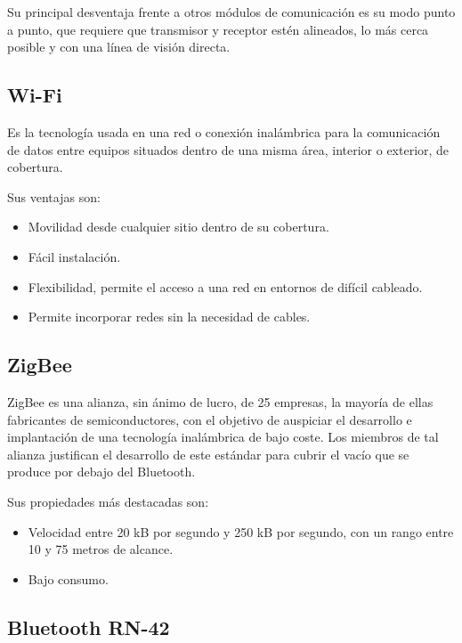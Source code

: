			Su principal desventaja frente a otros m\'odulos de comunicaci\'on es su modo punto a punto, que requiere que transmisor y receptor est\'en alineados, lo m\'as
			cerca posible y con una l\'inea de visi\'on directa.
		
		\subsection{Wi-Fi}
		
			Es la tecnolog\'ia usada en una red o conexi\'on inal\'ambrica para la comunicaci\'on de datos entre equipos situados dentro de una misma \'area, interior o exterior,
			de cobertura.
			
			Sus ventajas son:
			
			\begin{itemize}	
				\item Movilidad desde cualquier sitio dentro de su cobertura.
				\item F\'acil instalaci\'on.
				\item Flexibilidad, permite el acceso a una red en entornos de dif\'icil cableado.
				\item Permite incorporar redes sin la necesidad de cables.
			\end{itemize}
		
		\subsection{ZigBee}
		
			ZigBee es una alianza, sin \'animo de lucro, de 25 empresas, la mayor\'ia de ellas fabricantes de semiconductores, con el objetivo de auspiciar el desarrollo e implantaci\'on de una tecnolog\'ia inal\'ambrica de bajo coste. Los miembros de
			tal alianza justifican el desarrollo de este estándar para cubrir el vac\'io que se produce por debajo del Bluetooth.
			
			Sus propiedades m\'as destacadas son:
			
			\begin{itemize}	
				\item Velocidad entre 20 kB por segundo y 250 kB por segundo, con un rango entre 10 y 75 metros de alcance.
				\item Bajo consumo.
			\end{itemize}
		
		\subsection{Bluetooth RN-42}	
			
